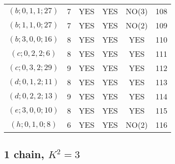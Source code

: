 \begin{longtable}{|c|c|c|c|c|c|}
$(b; 0, 1, 1; 27)$ & 7 & YES & YES & NO(3) & 108\\
$(b; 1, 1, 0; 27)$ & 7 & YES & YES & NO(2) & 109\\
$(b; 3, 0, 0; 16)$ & 8 & YES & YES & YES & 110\\
$(c; 0, 2, 2; 6)$ & 8 & YES & YES & YES & 111\\
$(c; 0, 3, 2; 29)$ & 9 & YES & YES & YES & 112\\
$(d; 0, 1, 2; 11)$ & 8 & YES & YES & YES & 113\\
$(d; 0, 2, 2; 13)$ & 9 & YES & YES & YES & 114\\
$(e; 3, 0, 0; 10)$ & 8 & YES & YES & YES & 115\\
$(h; 0, 1, 0; 8)$ & 6 & YES & YES & NO(2) & 116
\end{longtable}
\subsection{1 chain, $K^2 = 3$}
